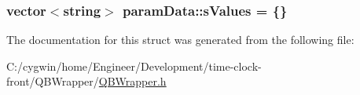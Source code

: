 \subsubsection[{s\+Values}]{\setlength{\rightskip}{0pt plus 5cm}vector$<$string$>$ param\+Data\+::s\+Values = \{\}}\label{structparam_data_a530e1ec7867fb4713b34a1dfa0cffe14}


The documentation for this struct was generated from the following file\+:\begin{DoxyCompactItemize}
\item 
C\+:/cygwin/home/\+Engineer/\+Development/time-\/clock-\/front/\+Q\+B\+Wrapper/\hyperlink{_q_b_wrapper_8h}{Q\+B\+Wrapper.\+h}\end{DoxyCompactItemize}

